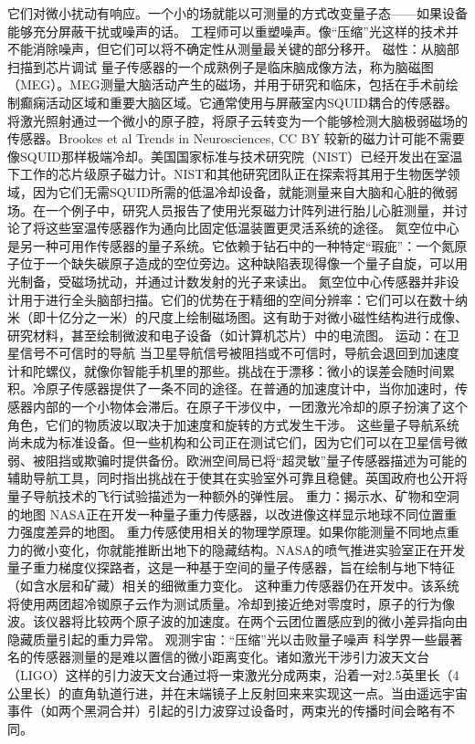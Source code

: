 \documentclass[12pt,a4paper]{ctexart}
\begin{document}
它们对微小扰动有响应。一个小的场就能以可测量的方式改变量子态——如果设备能够充分屏蔽干扰或噪声的话。
工程师可以重塑噪声。像“压缩”光这样的技术并不能消除噪声，但它们可以将不确定性从测量最关键的部分移开。
磁性：从脑部扫描到芯片调试
量子传感器的一个成熟例子是临床脑成像方法，称为脑磁图（MEG）。MEG测量大脑活动产生的磁场，并用于研究和临床，包括在手术前绘制癫痫活动区域和重要大脑区域。它通常使用与屏蔽室内SQUID耦合的传感器。
将激光照射通过一个微小的原子腔，将原子云转变为一个能够检测大脑极弱磁场的传感器。Brookes et al Trends in Neurosciences, CC BY
较新的磁力计可能不需要像SQUID那样极端冷却。美国国家标准与技术研究院（NIST）已经开发出在室温下工作的芯片级原子磁力计。NIST和其他研究团队正在探索将其用于生物医学领域，因为它们无需SQUID所需的低温冷却设备，就能测量来自大脑和心脏的微弱场。在一个例子中，研究人员报告了使用光泵磁力计阵列进行胎儿心脏测量，并讨论了将这些室温传感器作为通向比固定低温装置更灵活系统的途径。
氮空位中心是另一种可用作传感器的量子系统。它依赖于钻石中的一种特定“瑕疵”：一个氮原子位于一个缺失碳原子造成的空位旁边。这种缺陷表现得像一个量子自旋，可以用光制备，受磁场扰动，并通过计数发射的光子来读出。
氮空位中心传感器并非设计用于进行全头脑部扫描。它们的优势在于精细的空间分辨率：它们可以在数十纳米（即十亿分之一米）的尺度上绘制磁场图。这有助于对微小磁性结构进行成像、研究材料，甚至绘制微波和电子设备（如计算机芯片）中的电流图。
运动：在卫星信号不可信时的导航
当卫星导航信号被阻挡或不可信时，导航会退回到加速度计和陀螺仪，就像你智能手机里的那些。挑战在于漂移：微小的误差会随时间累积。冷原子传感器提供了一条不同的途径。在普通的加速度计中，当你加速时，传感器内部的一个小物体会滞后。在原子干涉仪中，一团激光冷却的原子扮演了这个角色，它们的物质波以取决于加速度和旋转的方式发生干涉。
这些量子导航系统尚未成为标准设备。但一些机构和公司正在测试它们，因为它们可以在卫星信号微弱、被阻挡或欺骗时提供备份。欧洲空间局已将“超灵敏”量子传感器描述为可能的辅助导航工具，同时指出挑战在于使其在实验室外可靠且稳健。英国政府也公开将量子导航技术的飞行试验描述为一种额外的弹性层。
重力：揭示水、矿物和空洞的地图
NASA正在开发一种量子重力传感器，以改进像这样显示地球不同位置重力强度差异的地图。
重力传感使用相关的物理学原理。如果你能测量不同地点重力的微小变化，你就能推断出地下的隐藏结构。NASA的喷气推进实验室正在开发量子重力梯度仪探路者，这是一种基于空间的量子传感器，旨在绘制与地下特征（如含水层和矿藏）相关的细微重力变化。
这种重力传感器仍在开发中。该系统将使用两团超冷铷原子云作为测试质量。冷却到接近绝对零度时，原子的行为像波。该仪器将比较两个原子波的加速度。在两个云团位置感应到的微小差异指向由隐藏质量引起的重力异常。
观测宇宙：“压缩”光以击败量子噪声
科学界一些最著名的传感器测量的是难以置信的微小距离变化。诸如激光干涉引力波天文台（LIGO）这样的引力波天文台通过将一束激光分成两束，沿着一对2.5英里长（4公里长）的直角轨道行进，并在末端镜子上反射回来来实现这一点。当由遥远宇宙事件（如两个黑洞合并）引起的引力波穿过设备时，两束光的传播时间会略有不同。
\end{document}

